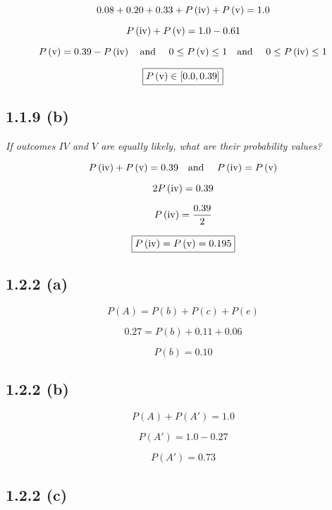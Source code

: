 \documentclass{article}
\begin{document}
\[
0.08 +
0.20 +
0.33 +
P\left(\textrm{\romannumeral 4}\right) +
P\left(\textrm{\romannumeral 5}\right) =
1.0
\]

\[
P\left(\textrm{\romannumeral 4}\right) +
P\left(\textrm{\romannumeral 5}\right) =
1.0 -
0.61
\]

\[
P\left(\textrm{\romannumeral 5}\right) =
0.39 -
P\left(\textrm{\romannumeral 4}\right)
\textrm{\quad and \quad}
0 \le P\left(\textrm{\romannumeral 5}\right) \le 1
\textrm{\quad and \quad}
0 \le P\left(\textrm{\romannumeral 4}\right) \le 1
\]

\[
\boxed{P\left(\textrm{\romannumeral 5}\right) \in \left[0.0, 0.39\right]}
\]

\subsection*{1.1.9 (b)}

\textit{If outcomes $IV$ and $V$ are equally likely, what are their probability values?}

\[
P\left(\textrm{\romannumeral 4}\right) +
P\left(\textrm{\romannumeral 5}\right) =
0.39
\text{\quad and \quad}
P\left(\textrm{\romannumeral 4}\right) =
P\left(\textrm{\romannumeral 5}\right)
\]

\[
2 P\left(\textrm{\romannumeral 4}\right) =
0.39
\]

\[
P\left(\textrm{\romannumeral 4}\right) = \frac{0.39}{2}
\]

\[
\boxed{
P\left(\textrm{\romannumeral 4}\right) =
P\left(\textrm{\romannumeral 5}\right) =
0.195
}
\]

\subsection*{1.2.2 (a)}

\[
P(A) = P(b) + P(c) + P(e)
\]

\[
0.27 = P(b) + 0.11 + 0.06
\]

\[
\boxed{P(b) = 0.10}
\]

\subsection*{1.2.2 (b)}

\[
P(A) + P(A') = 1.0
\]

\[
P(A') = 1.0 - 0.27
\]

\[
\boxed{P(A') = 0.73}
\]

\subsection*{1.2.2 (c)}
\end{document}
